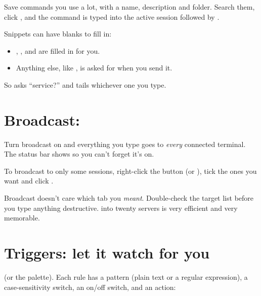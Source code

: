 Save commands you use a lot, with a name, description and folder. Search them, click
, and the command is typed into the active session followed by .


Snippets can have blanks to fill in:

\begin{itemize}
  \item {}, ,  and  are filled in for you.
  \item Anything else, like , is asked for when you send it.
\end{itemize}

So  asks ``service?'' and tails whichever one you type.

\section{Broadcast: }

Turn broadcast on and everything you type goes to \emph{every} connected terminal. The status bar shows
 so you can't forget it's on.


To broadcast to only some sessions, right-click the \iBroadcast{} button (or ), tick the ones you want and click .

\begin{danger}
Broadcast doesn't care which tab you \emph{meant}. Double-check the target list before you type anything
destructive.  into twenty servers is very efficient and very memorable.
\end{danger}

\section{Triggers: let it watch for you}

 (or the palette). Each rule has a pattern (plain text or a regular
expression), a case-sensitivity switch, an on/off switch, and an action:

